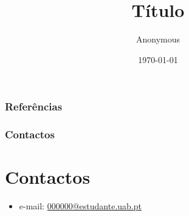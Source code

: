 \documentclass{beamer}
\title{Título}
\author{Anonymous}
\institute{Universidade Aberta}
\date{\today}
\newcommand{\nroAluno}{000000}
\begin{document}
\begin{frame}
	\titlepage
\end{frame}

\begin{frame}
	\frametitle{Referências}
	\nocite{uabpresentationtemplate}
	\printbibliography[heading=bibnumbered]
\end{frame}

\begin{frame}
	\frametitle{Contactos}
	\section{Contactos}
	\begin{itemize}
		\item e-mail:
			\href{mailto:\nroAluno @estudante.uab.pt}{\nroAluno @estudante.uab.pt}
	\end{itemize}
\end{frame}
\end{document}
